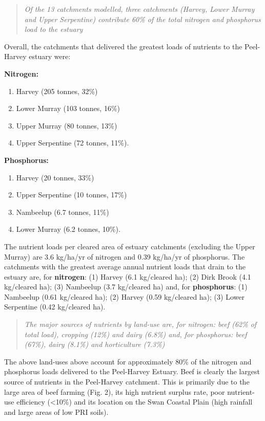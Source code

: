 \documentclass[
]{book}
\begin{document}
\begin{quote}
\emph{Of the 13 catchments modelled, three catchments (Harvey, Lower Murray and Upper Serpentine) contribute 60\% of the total nitrogen and phosphorus load to the estuary}
\end{quote}

Overall, the catchments that delivered the greatest loads of nutrients to the Peel-Harvey estuary were:

\textbf{Nitrogen:}~

\begin{enumerate}
\def\labelenumi{\arabic{enumi}.}
\item
  Harvey (205 tonnes, 32\%)
\item
  Lower Murray (103 tonnes, 16\%)
\item
  Upper Murray (80 tonnes, 13\%)
\item
  Upper Serpentine (72 tonnes, 11\%).
\end{enumerate}

\textbf{Phosphorus:}

\begin{enumerate}
\def\labelenumi{\arabic{enumi}.}
\item
  Harvey (20 tonnes, 33\%)
\item
  Upper Serpentine (10 tonnes, 17\%)~
\item
  Nambeelup (6.7 tonnes, 11\%)~
\item
  Lower Murray (6.2 tonnes, 10\%).
\end{enumerate}

The nutrient loads per cleared area of estuary catchments (excluding the Upper Murray) are 3.6 kg/ha/yr of nitrogen and 0.39 kg/ha/yr of phosphorus. The catchments with the greatest average annual nutrient loads that drain to the estuary are, for \textbf{nitrogen}: (1) Harvey (6.1 kg/cleared ha); (2) Dirk Brook (4.1 kg/cleared ha); (3) Nambeelup (3.7 kg/cleared ha) and, for \textbf{phosphorus}: (1) Nambeelup (0.61 kg/cleared ha); (2) Harvey (0.59 kg/cleared ha); (3) Lower Serpentine (0.42 kg/cleared ha).

\begin{quote}
\emph{The major sources of nutrients by land-use are, for nitrogen: beef (62\% of total load), cropping (12\%) and dairy (6.8\%) and, for phosphorus: beef (67\%), dairy (8.1\%) and horticulture (7.3\%)}
\end{quote}

The above land-uses above account for approximately 80\% of the nitrogen and phosphorus loads delivered to the Peel-Harvey Estuary. Beef is clearly the largest source of nutrients in the Peel-Harvey catchment. This is primarily due to the large area of beef farming (Fig. 2), its high nutrient surplus rate, poor nutrient-use efficiency (\textless10\%) and its location on the Swan Coastal Plain (high rainfall and large areas of low PRI soils).
\end{document}
